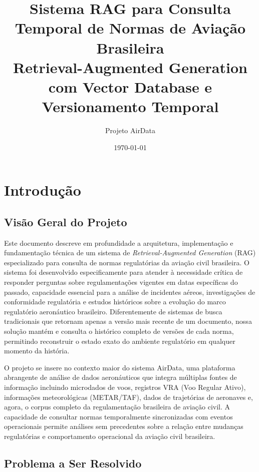 \documentclass[12pt,a4paper]{article}
\title{\textbf{Sistema RAG para Consulta Temporal de Normas de Aviação Brasileira}\\\large Retrieval-Augmented Generation com Vector Database e Versionamento Temporal}
\author{Projeto AirData}
\date{\today}
\begin{document}
\maketitle
\tableofcontents
\newpage

\section{Introdução}

\subsection{Visão Geral do Projeto}

Este documento descreve em profundidade a arquitetura, implementação e fundamentação técnica de um sistema de \textit{Retrieval-Augmented Generation} (RAG) especializado para consulta de normas regulatórias da aviação civil brasileira. O sistema foi desenvolvido especificamente para atender à necessidade crítica de responder perguntas sobre regulamentações vigentes em datas específicas do passado, capacidade essencial para a análise de incidentes aéreos, investigações de conformidade regulatória e estudos históricos sobre a evolução do marco regulatório aeronáutico brasileiro. Diferentemente de sistemas de busca tradicionais que retornam apenas a versão mais recente de um documento, nossa solução mantém e consulta o histórico completo de versões de cada norma, permitindo reconstruir o estado exato do ambiente regulatório em qualquer momento da história.

O projeto se insere no contexto maior do sistema AirData, uma plataforma abrangente de análise de dados aeronáuticos que integra múltiplas fontes de informação incluindo microdados de voos, registros VRA (Voo Regular Ativo), informações meteorológicas (METAR/TAF), dados de trajetórias de aeronaves e, agora, o corpus completo da regulamentação brasileira de aviação civil. A capacidade de consultar normas temporalmente sincronizadas com eventos operacionais permite análises sem precedentes sobre a relação entre mudanças regulatórias e comportamento operacional da aviação civil brasileira.

\subsection{Problema a Ser Resolvido}
\end{document}
